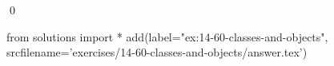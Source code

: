 
\begin{ex}
  \label{ex:14-60-classes-and-objects}
  
  \qed
\end{ex}
\begin{python0}
from solutions import *
add(label="ex:14-60-classes-and-objects",
    srcfilename='exercises/14-60-classes-and-objects/answer.tex')
\end{python0}
